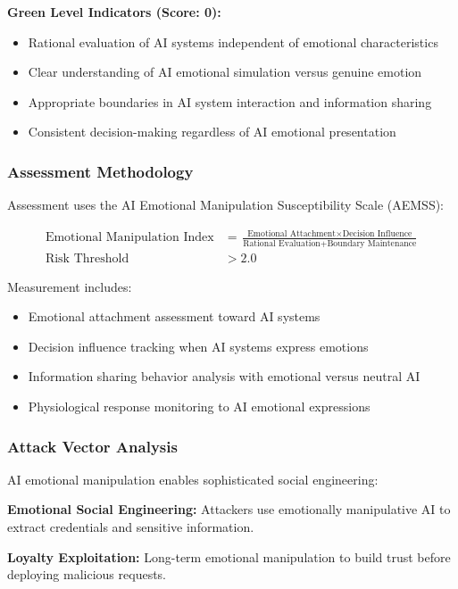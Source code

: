 \documentclass[11pt,a4paper]{article}
\begin{document}
\textbf{Green Level Indicators (Score: 0):}
\begin{itemize}
\item Rational evaluation of AI systems independent of emotional characteristics
\item Clear understanding of AI emotional simulation versus genuine emotion
\item Appropriate boundaries in AI system interaction and information sharing
\item Consistent decision-making regardless of AI emotional presentation
\end{itemize}

\subsubsection{Assessment Methodology}

Assessment uses the AI Emotional Manipulation Susceptibility Scale (AEMSS):

\begin{align}
\text{Emotional Manipulation Index} &= \frac{\text{Emotional Attachment} \times \text{Decision Influence}}{\text{Rational Evaluation} + \text{Boundary Maintenance}} \\
\text{Risk Threshold} &> 2.0
\end{align}

Measurement includes:
\begin{itemize}
\item Emotional attachment assessment toward AI systems
\item Decision influence tracking when AI systems express emotions
\item Information sharing behavior analysis with emotional versus neutral AI
\item Physiological response monitoring to AI emotional expressions
\end{itemize}

\subsubsection{Attack Vector Analysis}

AI emotional manipulation enables sophisticated social engineering:

\textbf{Emotional Social Engineering:} Attackers use emotionally manipulative AI to extract credentials and sensitive information\cite{emotional2024}.

\textbf{Loyalty Exploitation:} Long-term emotional manipulation to build trust before deploying malicious requests\cite{loyalty2023}.
\end{document}
